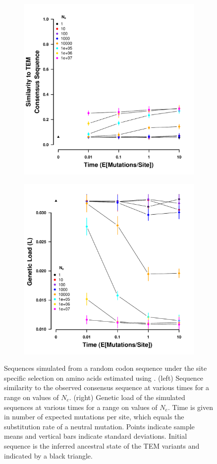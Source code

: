 \documentclass[12pt]{article}
\begin{document}
\begin{figure}[h]
    \centering
    \begin{subfigure}
        \centering
        \includegraphics[width=.45\textwidth]{img/simulated_dist_time_SELAC_random.pdf}
    \end{subfigure}
    \begin{subfigure}
        \centering
        \includegraphics[width=.45\textwidth]{img/simulated_gl_time_SELAC_random.pdf}
    \end{subfigure}
    \caption{Sequences simulated from a random codon sequence under the site specific selection on amino acids estimated using \selac. 
    (left) Sequence similarity to the observed consensus sequence at various times for a range on values of $N_e$.
    (right) Genetic load of the simulated sequences at various times for a range on values of $N_e$.
    Time is given in number of expected mutations per site, which equals the substitution rate of a neutral mutation.
    Points indicate sample means and vertical bars indicate standard deviations. Initial sequence is the inferred ancestral state of the TEM variants and indicated by a black triangle.}
    \label{fig:selac_sim_rand}
\end{figure}
\end{document}
